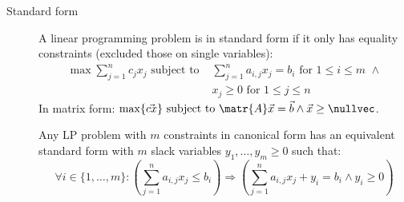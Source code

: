 \begin{description}
    \item[Standard form] 
        A linear programming problem is in standard form if it only has equality constraints (excluded those on single variables):
        \[ 
            \begin{split}
                \max \sum_{j=1}^{n} c_j x_j \text{ subject to } &\sum_{j=1}^{n} a_{i,j} x_j = b_i \text{ for } 1 \leq i \leq m \,\,\land \\
                    & x_j \geq 0 \text{ for } 1 \leq j \leq n
            \end{split}
        \]
        In matrix form: $\max \{ \vec{cx} \} \text{ subject to } \matr{A}\vec{x} = \vec{b} \land \vec{x} \geq \nullvec$.

        \begin{remark}
            Any LP problem with $m$ constraints in canonical form has an equivalent standard form with $m$ slack variables $y_1, \dots, y_m \geq 0$
            such that:
            \[ 
                \forall i \in \{ 1, \dots, m \}:
                \left( \sum_{j=1}^{n} a_{i,j} x_j \leq b_i \right) \Rightarrow 
                \left( \sum_{j=1}^{n} a_{i,j} x_j + y_i= b_i \land y_i \geq 0 \right)
            \]
        \end{remark}
\end{description}

